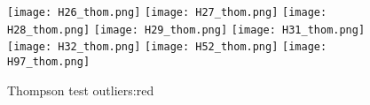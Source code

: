 \documentclass{article}
\begin{document}
\centering
\begin{figure}
    \centering
        \texttt{[image: H26\_thom.png]}
        \texttt{[image: H27\_thom.png]}
        \texttt{[image: H28\_thom.png]}
        \texttt{[image: H29\_thom.png]}
        \texttt{[image: H31\_thom.png]}
        \texttt{[image: H32\_thom.png]}
        \texttt{[image: H52\_thom.png]}
        \texttt{[image: H97\_thom.png]}
    \caption{Thompson test outliers:red}
\end{figure}
\end{document}
